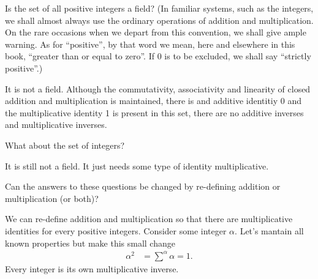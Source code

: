 \documentclass[12pt]{article}
\newenvironment{problem}[2][Problem]{\begin{trivlist} \item[\hskip \labelsep {\bfseries #1}\hskip \labelsep {\bfseries #2.}]}{\end{trivlist}}
\newenvironment{solution}[1][Solution]{\begin{trivlist} \item[\hskip \labelsep {\bfseries #1}]}{\end{trivlist}}
\begin{document}
\begin{problem}{2}
\begin{enumerate}
  \item Is the set of all positive integers a field? (In familiar systems, such as the integers, we shall almost always use the ordinary operations of addition and multiplication. On the rare occasions when we depart from this convention, we shall give ample warning. As for ``positive'', by that word we mean, here and elsewhere in this book, ``greater than or equal to zero''. If $0$ is to be excluded, we shall say ``strictly positive''.)
\begin{solution}
  It is not a field. Although the commutativity, associativity and linearity of closed addition and multiplication is maintained, there is and additive identitiy 0 and the multiplicative identity 1 is present in this set, there are no additive inverses and multiplicative inverses.
\end{solution}
\item What about the set of integers?
\begin{solution}
  It is still not a field. It just needs some type of identity multiplicative.
\end{solution}
\item Can the answers to these questions be changed by re-defining addition or multiplication (or both)?
\begin{solution}
  We can re-define addition and multiplication so that there are multiplicative identities for every positive integers. Consider some integer $\alpha$. Let's mantain all known properties but make this small change
\begin{align*}
  \alpha^{2} &= \sum^{\alpha} \alpha = 1.
\end{align*}
Every integer is its own multiplicative inverse.
\end{solution}
\end{enumerate}
\end{problem}
\end{document}
